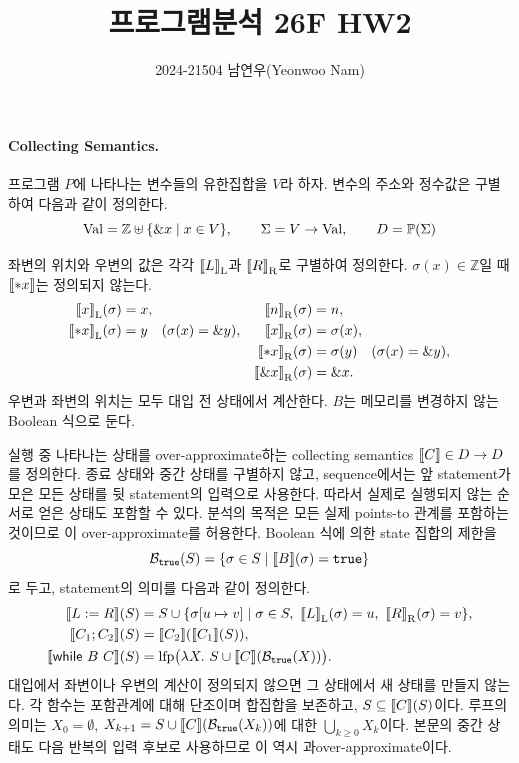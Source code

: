 \documentclass[a4paper, 10pt]{article}
\title{프로그램분석 26F HW2}
\author{2024-21504 남연우(Yeonwoo Nam)}
\date{}
\begin{document}


\maketitle

\paragraph{Collecting Semantics.}
프로그램 $P$에 나타나는 변수들의 유한집합을 $V$라 하자.
변수의 주소와 정수값은 구별하여 다음과 같이 정의한다.
\[
 \mathrm{Val}=\mathbb Z\uplus\{\&x\mid x\in V\},\qquad
 \Sigma=V\to\mathrm{Val},\qquad D=\mathbb{P}(\Sigma)
\]

좌변의 위치와 우변의 값은 각각 ${\llbracket L \rrbracket}_{\mathrm L}$과 ${\llbracket R \rrbracket}_{\mathrm R}$로 구별하여 정의한다.
$\sigma(x)\in\mathbb{Z}$일 때 ${\llbracket *x \rrbracket}$는 정의되지 않는다.
\[
\begin{aligned}
 {\llbracket x \rrbracket}_{\mathrm L}(\sigma)&=x,
 &{\llbracket n \rrbracket}_{\mathrm R}(\sigma)&=n,\\
 {\llbracket *x \rrbracket}_{\mathrm L}(\sigma)&=y\quad(\sigma(x)=\&y),
 &{\llbracket x \rrbracket}_{\mathrm R}(\sigma)&=\sigma(x),\\
 &&{\llbracket *x \rrbracket}_{\mathrm R}(\sigma)&=\sigma(y)\quad(\sigma(x)=\&y),\\
 &&{\llbracket \&x \rrbracket}_{\mathrm R}(\sigma)&=\&x.
\end{aligned}
\]
우변과 좌변의 위치는 모두 대입 전 상태에서 계산한다.
$B$는 메모리를 변경하지 않는 Boolean 식으로 둔다.

실행 중 나타나는 상태를 over-approximate하는 collecting semantics ${\llbracket C \rrbracket}\in D\rightarrow{} D$를 정의한다.
종료 상태와 중간 상태를 구별하지 않고, sequence에서는 앞 statement가 모은 모든 상태를
뒷 statement의 입력으로 사용한다. 따라서 실제로 실행되지 않는 순서로 얻은 상태도 포함할 수 있다.
분석의 목적은 모든 실제 points-to 관계를 포함하는 것이므로 이 over-approximate를 허용한다.
Boolean 식에 의한 state 집합의 제한을
\[
 \mathcal B_{\texttt{true}}(S)=\{\sigma\in S\mid{\llbracket B \rrbracket}(\sigma)=\texttt{true}\}
\]
로 두고, statement의 의미를 다음과 같이 정의한다.
\[
\begin{aligned}
 {\llbracket L:=R \rrbracket}(S)
  &=S\cup\{\sigma[u\mapsto v]\mid\sigma\in S,\
        {\llbracket L \rrbracket}_{\mathrm L}(\sigma)=u,\
        {\llbracket R \rrbracket}_{\mathrm R}(\sigma)=v\},\\
 {\llbracket C_1;C_2 \rrbracket}(S)&={\llbracket C_2 \rrbracket}({\llbracket C_1 \rrbracket}(S)),\\
 {\llbracket \mathsf{while}\ B\ C \rrbracket}(S)
  &=\operatorname{lfp}\bigl(\lambda X.~S\cup{\llbracket C \rrbracket}(\mathcal B_{\texttt{true}}(X))\bigr).
\end{aligned}
\]
대입에서 좌변이나 우변의 계산이 정의되지 않으면 그 상태에서 새 상태를 만들지 않는다.
각 함수는 포함관계에 대해 단조이며 합집합을 보존하고, $S\subseteq{\llbracket C \rrbracket}(S)$이다.
루프의 의미는 $X_0=\emptyset$,
$X_{k+1}=S\cup{\llbracket C \rrbracket}(\mathcal B_{\texttt{true}}(X_k))$에 대한
$\bigcup_{k\ge0}X_k$이다.
본문의 중간 상태도 다음 반복의 입력 후보로 사용하므로 이 역시 과over-approximate이다.
\end{document}
